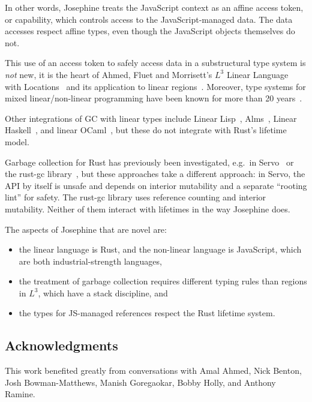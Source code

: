 In other words, Josephine treats the JavaScript context as an affine
access token, or capability, which controls access to the JavaScript-managed
data. The data accesses respect affine types, even though the JavaScript objects
themselves do not.

This use of an access token to safely access data in a substructural
type system is \emph{not} new, it is the heart of Ahmed, Fluet and
Morrisett's $L^3$ Linear Language with Locations~\cite{l3} and its
application to linear regions~\cite{regions}.
Moreover, type systems for mixed linear/non-linear programming have
been known for more than 20 years~\cite{mixed}.

Other integrations of GC with linear types include Linear Lisp~\cite{linear-lisp},
Alms~\cite{alms},
Linear Haskell~\cite{linear-haskell}, and
linear OCaml~\cite{linear-ocaml}, but these do not integrate with Rust's
lifetime model.

Garbage collection for Rust has previously been investigated,
e.g.~in Servo~\cite{servo-gc} or the rust-gc library~\cite{rust-gc},
but these approaches take a different approach: in Servo, the
API by itself is unsafe and depends on interior mutability and
a separate ``rooting lint'' for safety. The rust-gc library uses
reference counting and interior mutability. Neither of them interact
with lifetimes in the way Josephine does.

The aspects of Josephine that are novel are:
\begin{itemize}

\item the linear language is Rust, and the non-linear language is
  JavaScript, which are both industrial-strength languages,

\item the treatment of garbage collection requires
  different typing rules than regions in $L^3$, which have a stack
  discipline, and

\item the types for JS-managed references respect the Rust
  lifetime system.

\end{itemize}

\subsection*{Acknowledgments}

This work benefited greatly from conversations with
Amal Ahmed,
Nick Benton,
Josh Bowman-Matthews,
Manish Goregaokar,
Bobby Holly, and
Anthony Ramine.
